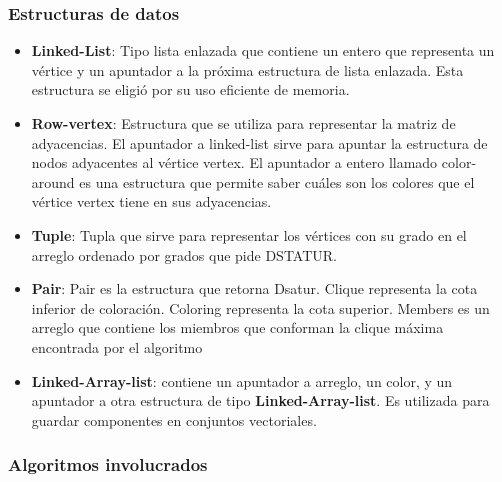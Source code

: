 \documentclass[a4paper,10pt]{article}
\begin{document}
\subsubsection{Estructuras de datos}
\begin{itemize}
 \item \textbf{Linked-List}:  Tipo lista enlazada que contiene un entero que representa un vértice y un apuntador
 a la próxima estructura de lista enlazada. Esta estructura se eligió por su uso eficiente de memoria.
 \item \textbf{Row-vertex}: Estructura que se utiliza para representar
la matriz de adyacencias. El apuntador a linked-list
sirve para apuntar la estructura de nodos adyacentes
al vértice vertex. El apuntador a entero llamado
color-around es una estructura que permite saber
cuáles son los colores que el vértice vertex tiene
en sus adyacencias.
 \item \textbf{Tuple}: Tupla que sirve para representar los vértices con su 
 grado en el arreglo ordenado por grados que pide DSTATUR.
 \item \textbf{Pair}: Pair es la estructura que retorna Dsatur.
Clique representa la cota inferior de coloración.
Coloring representa la cota superior.
Members es un arreglo que contiene los miembros
que conforman la clique máxima encontrada por el algoritmo
 \item \textbf{Linked-Array-list}: contiene un apuntador a arreglo, un color, y un apuntador a otra estructura 
de tipo \textbf{Linked-Array-list}. Es utilizada para guardar componentes en conjuntos vectoriales.
\end{itemize}

\subsubsection{Algoritmos involucrados}
\end{document}

